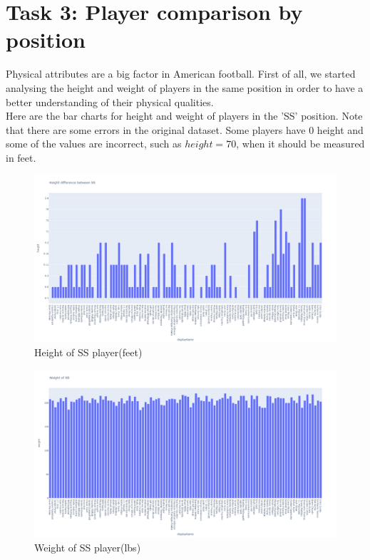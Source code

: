 \documentclass{article}
\begin{document}
\section{Task 3: Player comparison by position}
Physical attributes are a big factor in American football. First of all, we started analysing the height and weight of players in the same position in order to have a better understanding of their physical qualities.\\
Here are the bar charts for height and weight of players in the 'SS' position. Note that there are some errors in the original dataset. Some players have 0 height and some of the values are incorrect, such as $height = 70$, when it should be measured in feet. 
\begin{figure}[H]
	\includegraphics[width=\linewidth,height=\textheight,keepaspectratio]{height.png}
	\caption{Height of SS player(feet)}
\end{figure} 
\begin{figure}[H]
	\includegraphics[width=\linewidth,height=\textheight,keepaspectratio]{weight.png}
	\caption{Weight of SS player(lbs)}
\end{figure} 
\end{document}
